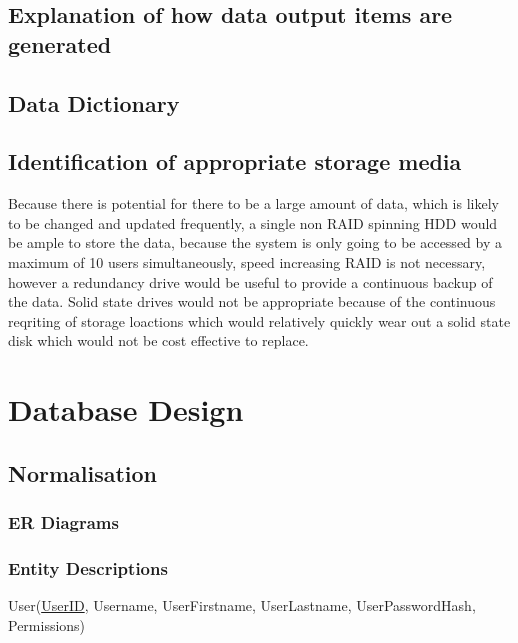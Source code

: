 \subsection{Explanation of how data output items are generated}

\subsection{Data Dictionary}


\subsection{Identification of appropriate storage media}

	Because there is potential for there to be a large amount of data, which is likely to be changed and updated frequently, a single non RAID
	spinning HDD would be ample to store the data, because the system is only going to be accessed by a maximum of 10 users simultaneously, speed
	increasing RAID	is not necessary, however a redundancy drive would be useful to provide a continuous backup of the data. Solid state drives
	would not be appropriate because of the continuous reqriting of storage loactions which  would relatively quickly wear out a solid state disk
	which would not be cost effective to replace.

\section{Database Design}

\subsection{Normalisation}

\subsubsection{ER Diagrams}
	\begin{figure}[H]
	\end{figure}

\subsubsection{Entity Descriptions}
User(\underline{UserID}, Username, UserFirstname, UserLastname, UserPasswordHash, Permissions)

